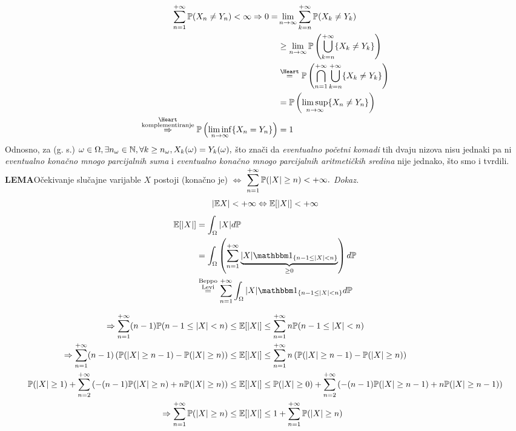 \documentclass{article}
\newcommand{\mylimsup}{\underset{n\to\infty}{\lim\sup}}
\newcommand{\myliminf}{\underset{n\to\infty}{\lim\inf}}
\begin{document}
\[\begin{aligned}\sum_{n=1}^{+\infty}\Bbb P(X_n\ne Y_n)<\infty\Rightarrow0=&\lim_{n\to\infty}\sum_{k=n}^{+\infty}\Bbb P(X_k\ne Y_k)\\&\ge\lim_{n\to\infty}\Bbb P\left(\bigcup_{k=n}^{+\infty}\{X_k\ne Y_k\}\right)\\&\overset{\text{\Heart}}{=}\Bbb P\left(\bigcap_{n=1}^{+\infty}\bigcup_{k=n}^{+\infty}\{X_k\ne Y_k\}\right)\\&=\Bbb P\left(\mylimsup \{X_n\ne Y_n\}\right)\\\overset{\substack{\text{\Heart}\\\text{komplementiranje}}}{\Rightarrow}\Bbb P\left(\myliminf \{X_n=Y_n\}\right)&=1\end{aligned}\] Odnosno, za (g. s.) \(\omega\in\Omega,\exists n_\omega\in\Bbb N,\forall k\ge n_\omega, X_k(\omega)=Y_k(\omega),\) što znači da \emph{eventualno početni komadi} tih dvaju nizova nisu jednaki pa ni \emph{eventualno konačno mnogo parcijalnih suma} i \emph{eventualno konačno mnogo parcijalnih aritmetičkih sredina} nije jednako, što smo i tvrdili.\newline\newline
\textbf{LEMA}\newline Očekivanje slučajne varijable \(X\) postoji (konačno je) \(\Leftrightarrow\) \(\displaystyle\sum_{n=1}^{+\infty}\Bbb P(|X|\ge n)<+\infty.\)\newline\newline
\textit{Dokaz.}\newline
\[|\Bbb EX|<+\infty\Leftrightarrow\Bbb E[|X|]<+\infty\] \[\begin{aligned}\Bbb E[|X|]&=\int_\Omega|X|d\Bbb P\\&=\int_\Omega\left(\sum_{n=1}^{+\infty}\underbrace{|X|\mathbbm 1_{\left\{n-1\le|X|<n\right\}}}_{\ge 0}\right)d\Bbb P\\&\overset{\substack{\text{Beppo}\\\text{Levi}}}{=}\sum_{n=1}^{+\infty}\int_\Omega|X|\mathbbm 1_{\left\{n-1\le|X|<n\right\}}d\Bbb P\end{aligned}\] 
\newpage
{}
\begin{flushleft}\[\begin{aligned}\Rightarrow\sum_{n=1}^{+\infty}(n-1)\Bbb P(n-1\le|X|<n)&\le\Bbb E[|X|]\le\sum_{n=1}^{+\infty}n\Bbb P(n-1\le|X|<n)\\\Rightarrow\sum_{n=1}^{+\infty}(n-1)\left(\Bbb P(|X|\ge n-1)-\Bbb P(|X|\ge n)\right)&\le\Bbb E[|X|]\le\sum_{n=1}^{+\infty}n\left(\Bbb P(|X|\ge n-1)-\Bbb P(|X|\ge n)\right)\\\Bbb P(|X|\ge 1)+\sum_{n=2}^{+\infty}\left(-(n-1)\Bbb P(|X|\ge 
 n)+n\Bbb P(|X|\ge n)\right)&\le\Bbb E[|X|]\le\Bbb P(|X|\ge 0)+\sum_{n=2}^{+\infty}\left(-(n-1)\Bbb P(|X|\ge n-1)+n\Bbb P(|X|\ge n-1)\right)\\\Rightarrow\sum_{n=1}^{+\infty}\Bbb P(|X|\ge n)&\le\Bbb E[|X|]\le1+\sum_{n=1}^{+\infty}\Bbb P(|X|\ge n)\end{aligned}\]\end{flushleft}
\end{document}

